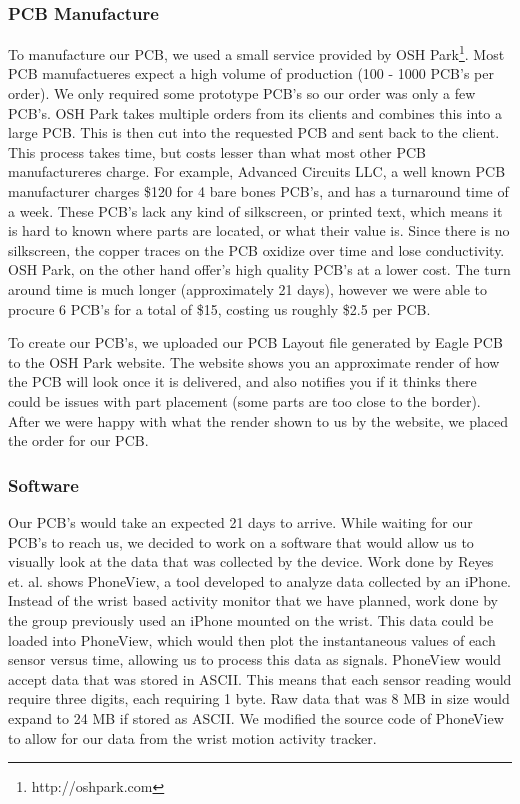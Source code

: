 \subsubsection{PCB Manufacture}
To manufacture our PCB, we used a small service provided by OSH Park\footnote{http://oshpark.com}.
Most PCB manufactueres expect a high volume of production (100 - 1000 PCB's per order).
We only required some prototype PCB's so our order was only a few PCB's.
OSH Park takes multiple orders from its clients and combines this into a large PCB.
This is then cut into the requested PCB and sent back to the client.
This process takes time, but costs lesser than what most other PCB manufactureres charge.
For example,
Advanced Circuits LLC,
a well known PCB manufacturer charges \$120 for 4 bare bones PCB's,
and has a turnaround time of a week.
These PCB's lack any kind of silkscreen,
or printed text,
which means it is hard to known where parts are located,
or what their value is.
Since there is no silkscreen,
the copper traces on the PCB oxidize over time and lose conductivity.
OSH Park,
on the other hand offer's high quality PCB's at a lower cost.
The turn around time is much longer (approximately 21 days),
however we were able to procure 6 PCB's for a total of \$15,
costing us roughly \$2.5 per PCB.

To create our PCB's, we uploaded our PCB Layout file generated by Eagle PCB to the OSH Park website.
The website shows you an approximate render of how the PCB will look once it is delivered,
and also notifies you if it thinks there could be issues with part placement (some parts are too close to the border).
After we were happy with what the render shown to us by the website,
we placed the order for our PCB.

\subsubsection{Software}
\label{Sec:Software}
Our PCB's would take an expected 21 days to arrive. While waiting for our PCB's to reach us,
we decided to work on a software that would allow us to visually look at the data that was collected by the device.
Work done by Reyes et. al. \cite{concha2014study} shows PhoneView,
a tool developed to analyze data collected by an iPhone.
Instead of the wrist based activity monitor that we have planned,
work done by the group previously used an iPhone mounted on the wrist.
This data could be loaded into PhoneView,
which would then plot the instantaneous values of each sensor versus time,
allowing us to process this data as signals.
PhoneView would accept data that was stored in ASCII.
This means that each sensor reading would require three digits,
each requiring 1 byte.
Raw data that was 8 MB in size would expand to 24 MB if stored as ASCII.
We modified the source code of PhoneView to allow for our data from the wrist motion activity tracker.

